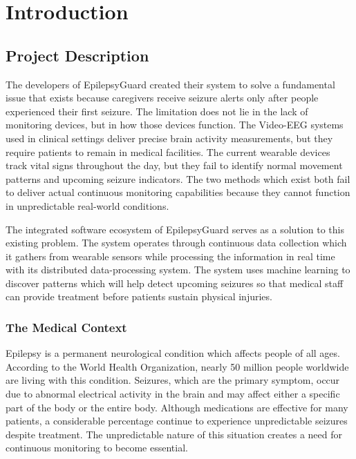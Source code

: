 \documentclass[12pt, a4paper, oneside]{report}
\newcommand{\chapterpage}[2]{%
    \cleardoublepage
    \thispagestyle{empty}
    \vspace*{\fill}
    \begin{center}
        \huge \textbf{Chapter #1} \\
        \vspace{1cm}
        \Huge #2
    \end{center}
    \vspace*{\fill}
    \newpage
}
\begin{document}



\clearpage
{}
\setcounter{page}{1}
\pagestyle{empty}


\chapter{Introduction}

\section{Project Description}

The developers of EpilepsyGuard created their system to solve a fundamental issue that exists because caregivers receive seizure alerts only after people experienced their first seizure. The limitation does not lie in the lack of monitoring devices, but in how those devices function. The Video-EEG systems used in clinical settings deliver precise brain activity measurements, but they require patients to remain in medical facilities. The current wearable devices track vital signs throughout the day, but they fail to identify normal movement patterns and upcoming seizure indicators. The two methods which exist both fail to deliver actual continuous monitoring capabilities because they cannot function in unpredictable real-world conditions.

The integrated software ecosystem of EpilepsyGuard serves as a solution to this existing problem. The system operates through continuous data collection which it gathers from wearable sensors while processing the information in real time with its distributed data-processing system. The system uses machine learning to discover patterns which will help detect upcoming seizures so that medical staff can provide treatment before patients sustain physical injuries.

\subsection{The Medical Context}

Epilepsy is a permanent neurological condition which affects people of all ages. According to the World Health Organization, nearly 50 million people worldwide are living with this condition. Seizures, which are the primary symptom, occur due to abnormal electrical activity in the brain and may affect either a specific part of the body or the entire body. Although medications are effective for many patients, a considerable percentage continue to experience unpredictable seizures despite treatment. The unpredictable nature of this situation creates a need for continuous monitoring to become essential.
\end{document}
